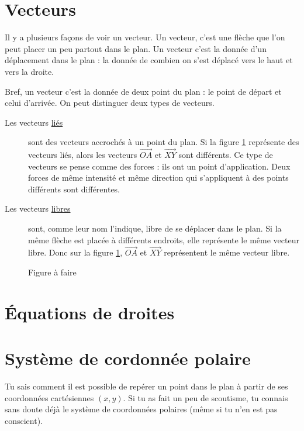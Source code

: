 \section{Vecteurs}

Il y a plusieurs façons de voir un vecteur. Un vecteur, c'est une flèche que l'on peut placer un peu partout dans le plan. Un vecteur c'est la donnée d'un déplacement dans le plan : la donnée de combien on s'est déplacé vers le haut et vers la droite.

Bref, un vecteur c'est la donnée de deux point du plan : le point de départ et celui d'arrivée. On peut distinguer deux types de vecteurs.
\begin{description}

\item[Les vecteurs \href{http://fr.wikipedia.org/wiki/Vente_liée}{liés}] sont des vecteurs accrochés à un point du plan. Si la figure \ref{FigVectLiesoupas} représente des vecteurs liés, alors les vecteurs $\overrightarrow{OA}$ et $\overrightarrow{XY}$ sont différents. Ce type de vecteurs se pense comme des forces : ils ont un point d'application. Deux forces de même intensité et même direction qui s'appliquent à des points différents sont différentes.

\item[Les vecteurs \href{http://fr.wikipedia.org/wiki/Portail:Logiciels_libres}{libres}] sont, comme leur nom l'indique, libre de se déplacer dans le plan. Si la même flèche est placée à différents endroits, elle représente le même vecteur libre. Donc sur la figure \ref{FigVectLiesoupas}, $\overrightarrow{OA}$ et $\overrightarrow{ XY }$ représentent le même vecteur libre.
\end{description}

\begin{figure}
\caption{Figure à faire}  \label{FigVectLiesoupas}
\end{figure}

\section{Équations de droites}


\section{Système de cordonnée polaire}

Tu sais comment il est possible de repérer un point dans le plan à partir de ses coordonnées cartésiennes $(x,y)$. Si tu as fait un peu de scoutisme, tu connais sans doute déjà le système de coordonnées polaires (même si tu n'en est pas conscient).

